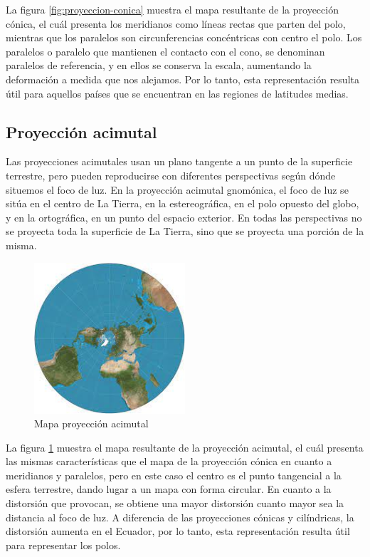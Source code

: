 La figura \ref{fig:proyeccion-conica} muestra el mapa resultante de la proyección cónica, el cuál presenta los meridianos como líneas rectas que parten del polo,
mientras que los paralelos son circunferencias concéntricas con centro el polo.
Los paralelos o paralelo que mantienen el contacto con el cono, se denominan paralelos de referencia, y en ellos se conserva la escala, aumentando la deformación a medida que nos alejamos.
Por lo tanto, esta representación resulta útil para aquellos países que se encuentran en las regiones de latitudes medias.

\subsection{Proyección acimutal}
Las proyecciones acimutales usan un plano tangente a un punto de la superficie terrestre, pero pueden reproducirse con diferentes perspectivas según dónde situemos el foco de luz.
En la proyección acimutal gnomónica, el foco de luz se sitúa en el centro de La Tierra, en la estereográfica, en el polo opuesto del globo, y en la ortográfica, en un punto del espacio exterior.
En todas las perspectivas no se proyecta toda la superficie de La Tierra, sino que se proyecta una porción de la misma.

\begin{figure}[H]
  \centering
  \includegraphics[width=0.50\textwidth]{Imagenes/CRS/proyeccion-acimutal.png}
  \caption{Mapa proyección acimutal} \label{fig:proyeccion-acimutal}
\end{figure}

La figura \ref{fig:proyeccion-acimutal} muestra el mapa resultante de la proyección acimutal, el cuál presenta las mismas características que el mapa de la proyección cónica en cuanto a meridianos y paralelos, pero en este caso el centro es el punto tangencial a la esfera terrestre, dando lugar a un mapa con forma circular.
En cuanto a la distorsión que provocan, se obtiene una mayor distorsión cuanto mayor sea la distancia al foco de luz. 
A diferencia de las proyecciones cónicas y cilíndricas, la distorsión aumenta en el Ecuador, por lo tanto, esta representación resulta útil para representar los polos.
\\
\\

